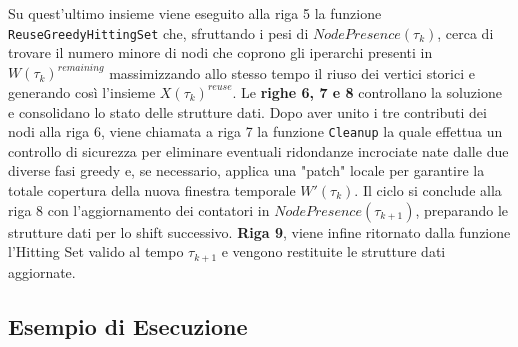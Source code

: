 Su quest'ultimo insieme viene eseguito alla riga 5 la funzione \texttt{ReuseGreedyHittingSet} che, sfruttando i pesi di $NodePresence(\tau_k)$, cerca di trovare il numero minore di nodi che coprono gli iperarchi presenti in $W(\tau_k)^{remaining}$ massimizzando allo stesso tempo il riuso dei vertici storici e generando così l'insieme $X(\tau_k)^{reuse}$.\newline
Le \textbf{righe 6, 7 e 8} controllano la soluzione e consolidano lo stato delle strutture dati.
Dopo aver unito i tre contributi dei nodi alla riga 6, viene chiamata a riga 7 la funzione \texttt{Cleanup} la quale effettua un controllo di sicurezza per eliminare eventuali ridondanze incrociate nate dalle due diverse fasi greedy e, se necessario, applica una "patch" locale per garantire la totale copertura della nuova finestra temporale $W'(\tau_k)$.
Il ciclo si conclude alla riga 8 con l'aggiornamento dei contatori in $NodePresence(\tau_{k+1})$, preparando le strutture dati per lo shift successivo.\newline
\textbf{Riga 9}, viene infine ritornato dalla funzione l'Hitting Set valido al tempo $\tau_{k+1}$ e vengono restituite le strutture dati aggiornate.

\subsection{Esempio di Esecuzione}

